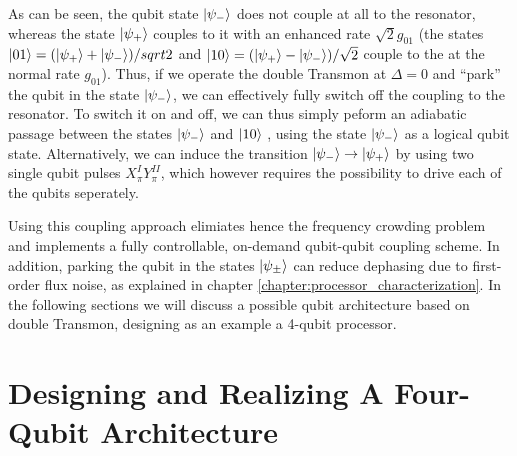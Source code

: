 %
As can be seen, the qubit state $\left| \psi_- \right>$ does not couple at all to the resonator, whereas the state $\left| \psi_+ \right>$ couples to it with an enhanced rate $\sqrt{2}g_{01}$ (the states $\left| 01 \right>=(\left| \psi_+ \right>+\left| \psi_- \right>)/sqrt{2}$ and $\left| 10 \right>=(\left| \psi_+ \right>-\left| \psi_- \right>)/\sqrt{2}$ couple to the at the normal rate $g_{01}$). Thus, if we operate the double Transmon at $\Delta = 0$ and ``park'' the qubit in the state $\left| \psi_- \right>$, we can effectively fully switch off the coupling to the resonator. To switch it on and off, we can thus simply peform an adiabatic passage between the states $\left| \psi_- \right>$ and $\left| 10 \right>$ \citep{srinivasan_tunable_2011}, using the state $\left| \psi_- \right>$ as a logical qubit state. Alternatively, we can induce the transition $\left| \psi_- \right>\to\left| \psi_+ \right>$ by using two single qubit pulses $X^I_\pi Y^{II}_\pi$, which however requires the possibility to drive each of the qubits seperately.

\smallskip

Using this coupling approach elimiates hence the frequency crowding problem and implements a fully controllable, on-demand qubit-qubit coupling scheme. In addition, parking the qubit in the states $\left| \psi_\pm \right>$ can reduce dephasing due to first-order flux noise, as explained in chapter \ref{chapter:processor_characterization}. In the following sections we will discuss a possible qubit architecture based on double Transmon, designing as an example a 4-qubit processor.

%
%


\section{Designing and Realizing A Four-Qubit Architecture}

